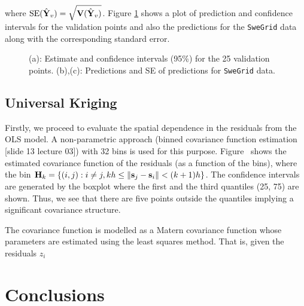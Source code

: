 \documentclass[a4paper,10pt]{article}
\def\bY{{\bf Y}}
\def\bV{{\bf V}}
\def\bH{{\bf H}}
\def\bs{{\bf s}}
\begin{document}
where $\text{SE}(\hat \bY_v) = \sqrt{\bV(\hat \bY_v)}$. Figure \ref{fig:olsresults} shows a plot of prediction and confidence intervals for the validation points and also the predictions for the {\texttt{SweGrid}} data along with the corresponding standard error.
\begin{figure}[ht]
\centering
  \qquad
  \qquad
  \caption{(a): Estimate and confidence intervals (95\%) for the 25 validation points. (b),(c): Predictions and SE of predictions for \texttt{SweGrid} data.}
\label{fig:olsresults}
\end{figure}

\subsection{Universal Kriging}
Firstly, we proceed to evaluate the spatial dependence in the residuals from the OLS model. A non-parametric approach (binned covariance function estimation [slide 13 lecture 03]) with 32 bins is used for this purpose. Figure~ shows the estimated covariance function of the residuals (as a function of the bins), where the bin $\bH_k = \{ (i,j): i \ne j, kh \le \| \bs_j - \bs_i \| < (k+1)h \}$. The confidence intervals are generated by the boxplot where the first and the third quantiles (25, 75) are shown. Thus, we see that there are five points outside the quantiles implying a significant covariance structure.

The covariance function is modelled as a Matern covariance function whose parameters are estimated using the least squares method. That is, given the residuals $z_i$
\section{Conclusions}
\end{document}

